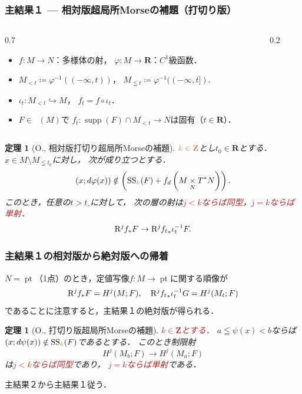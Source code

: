 \documentclass[dvipdfmx,10pt,aspectratio=169,leqno]{beamer}%
\newcommand{\zz}{\mathbf{Z}}
\newcommand{\rr}{\mathbf{R}}
\numberwithin{equation}{subsection}
\newcommand{\pt}{\mathop{\mathrm{pt}}\nolimits}
\newcommand{\supp}{\mathop{\mathrm{supp}}\nolimits}
\newcommand{\Dompb}{\mathop{\mathsf{D}^\mathrm{b}}\nolimits}
\newcommand{\muS}[1][]{\mathop{\mathrm{SS}}\nolimits_{#1}}
\newcommand{\Rder}[1][]{\mathop{\mathrm{R}^{#1}\hspace{-2pt}}\nolimits}
\newcommand{\mdiff}[1][]{{#1}_{d}} %
\newcommand{\pb}[1][]{\mathbin{\mathop{\times}\limits_{#1}}}
\newcommand{\cotb}[1][]{T^{\ast}{#1}}
\theoremstyle{mystyle}
\newtheorem{THM}[AXM]{定理}
\begin{document}
\begin{frame}[fragile]
  \frametitle{主結果１ --- 相対版超局所Morseの補題（打切り版）}
  \begin{columns}
    \begin{column}{0.7\hsize}
      \begin{itemize}
        \item \(f\colon M\to N\)：多様体の射，
        \quad\(\varphi\colon M\to \rr\)：\(C^{1}\)級函数．
        \item \(M_{<t}\coloneqq \varphi^{-1}((-\infty,t))\)，\quad
        \(M_{\leqq t}\coloneqq \varphi^{-1}((-\infty,t])\).
        \item \(\iota_{t}\colon M_{<t}\hookrightarrow M\)，
        \quad\(f_{t}=f\circ \iota_{t}\)．
        \item \(F\in\Dompb(M)\)で
        \(f_{t}\colon \supp(F)\cap \overline{M_{<t}}\to N\)は固有（\(t\in\rr\)）．
      \end{itemize}
    \end{column}
    \begin{column}{0.2\hsize}
    \end{column}
  \end{columns}
  \begin{THM}[O., 相対版打切り超局所Morseの補題]
    \(\textcolor{brown}{k\in\zz}\)とし\(t_{0}\in\rr\)とする．
    \(x\in M\setminus M_{\leqq t_{0}}\)に対し，
    次が成り立つとする．\[
        (x;d\varphi(x))\notin \left(
          \muS[\textcolor{brown}{k}](F)+ \mdiff[f]\left(
            M\pb[N]\cotb[N]
          \right)
        \right).
      \]
    このとき，任意の\(t>t_{\circ}\)に対して，
    次の層の射は\textcolor{brown}{\(j<k\)ならば同型}，\textcolor{brown}{\(j=k\)ならば単射}．
    \[
      \Rder[j]{f_{\ast}}F
      \to
      \Rder[j]{{f_{t}}_{\ast}}\iota^{-1}_{t}F.
    \]
  \end{THM}
\end{frame}
\begin{frame}
  \frametitle{主結果１の相対版から絶対版への帰着}
  \(N=\pt\)（1点）のとき，定値写像\(f\colon M\to \pt\)に関する順像が\[
    \Rder[j]{f_{\ast}}F=H^{j}(M;F),
    \quad
    \Rder[j]{{f_{t}}_{\ast}}\iota^{-1}_{t}G
    =H^{j}(M_{t};F)
  \]
  であることに注意すると，主結果１の絶対版が得られる．
  \begin{THM}[O., 打切り版超局所Morseの補題]
    \textcolor{brown}{\(k\in\zz\)とする．}
    \(a\leqq\psi(x)< b\)ならば
    \((x;d\psi(x))\notin\muS[\textcolor{brown}{k}](F)\)であるとする．
    このとき制限射\[
        H^{j}(M_b;F)\longrightarrow H^{j}(M_a;F)
    \]は\textcolor{brown}{\(j<k\)ならば同型}であり，
    \textcolor{brown}{\(j=k\)ならば単射}である．
  \end{THM}    
  主結果２から主結果１従う．
\end{frame}
\end{document}
